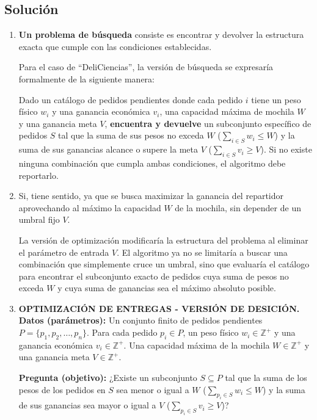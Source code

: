 \subsection{Solución}
\begin{enumerate}[label=(\alph*), leftmargin=*]
    \item \textbf{Un problema de búsqueda} consiste es encontrar y devolver la estructura exacta que cumple con las condiciones establecidas.

Para el caso de ``DeliCiencias'', la versión de búsqueda se expresaría formalmente de la siguiente manera:

Dado un catálogo de pedidos pendientes donde cada pedido $i$ tiene un peso físico $w_i$ y una ganancia económica $v_i$, una capacidad máxima de mochila $W$ y una ganancia meta $V$, \textbf{encuentra y devuelve} un subconjunto específico de pedidos $S$ tal que la suma de sus pesos no exceda $W$ ($\sum_{i \in S} w_i \le W$) y la suma de sus ganancias alcance o supere la meta $V$ ($\sum_{i \in S} v_i \ge V$). Si no existe ninguna combinación que cumpla ambas condiciones, el algoritmo debe reportarlo.

    \item Si, tiene sentido, ya que se busca maximizar la ganancia del repartidor aprovechando al máximo la capacidad $W$ de la mochila, sin depender de un umbral fijo $V$.
    
    La versión de optimización modificaría la estructura del problema al eliminar el parámetro de entrada $V$. El algoritmo ya no se limitaría a buscar una combinación que simplemente cruce un umbral, sino que evaluaría el catálogo para encontrar el subconjunto exacto de pedidos cuya suma de pesos no exceda $W$ y cuya suma de ganancias sea el máximo absoluto posible. 
    
    \item \textbf{OPTIMIZACIÓN DE ENTREGAS - VERSIÓN DE DESICIÓN.}\\
    \textbf{Datos (parámetros):} Un conjunto finito de pedidos pendientes $P = \{p_1, p_2, \dots, p_n\}$. Para cada pedido $p_i \in P$, un peso físico $w_i \in \mathbb{Z}^+$ y una ganancia económica $v_i \in \mathbb{Z}^+$. Una capacidad máxima de la mochila $W \in \mathbb{Z}^+$ y una ganancia meta $V \in \mathbb{Z}^+$.

    \textbf{Pregunta (objetivo):} ¿Existe un subconjunto $S \subseteq P$ tal que la suma de los pesos de los pedidos en $S$ sea menor o igual a $W$ ($\sum_{p_i \in S} w_i \le W$) y la suma de sus ganancias sea mayor o igual a $V$ ($\sum_{p_i \in S} v_i \ge V$)?
\end{enumerate}